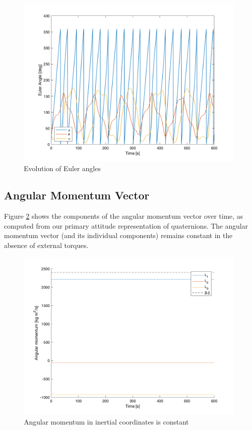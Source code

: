 \begin{figure}[H]
\centering
\includegraphics[scale=0.6]{Images/ps3_problem6_euler.png}
\caption{Evolution of Euler angles}
\label{fig:ps3_problem6_euler}
\end{figure}

\subsection{Angular Momentum Vector}
Figure \ref{fig:ps3_problem7a} shows the components of the angular momentum vector over time, as computed from our primary attitude representation of quaternions. The angular momentum vector (and its individual components) remains constant in the absence of external torques.

\begin{figure}[H]
\centering
\includegraphics[scale=0.6]{Images/ps3_problem7a.png}
\caption{Angular momentum in inertial coordinates is constant}
\label{fig:ps3_problem7a}
\end{figure}

